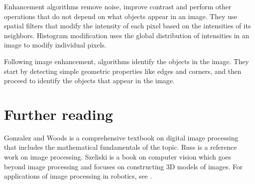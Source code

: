 Enhancement algorithms remove noise, improve contrast and perform other operations that do not depend on what objects appear in an image. They use spatial filters that modify the intensity of each pixel based on the intensities of its neighbors. Histogram modification uses the global distribution of intensities in an image to modify individual pixels.

Following image enhancement, algorithms identify the objects in the image. They start by detecting simple geometric properties like edges and corners, and then proceed to identify the objects that appear in the image.

\section{Further reading}

Gonzalez and Woods \cite{GW} is a comprehensive textbook on digital image processing that includes the mathematical fundamentals of the topic. Russ \cite{russ} is a reference work on image processing. Szeliski \cite{szeliski} is a book on computer vision which goes beyond image processing and focuses on constructing 3D models of images. For applications of image processing in robotics, see \cite[Chapter~4]{siegwart}.
